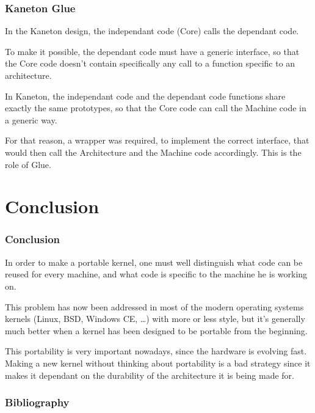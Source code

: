 \begin{frame}
  \frametitle{Kaneton Glue}

  In the Kaneton design, the independant code (Core) calls the dependant code.

  \-

  To make it possible, the dependant code must have a generic interface, so that the Core code doesn't contain specifically any call to a function specific to an architecture.

  \-

  In Kaneton, the independant code and the dependant code functions share exactly the same prototypes, so that the Core code can call the Machine code in a generic way.

  \-

  For that reason, a wrapper was required, to implement the correct interface, that would then call the Architecture and the Machine code accordingly. This is the role of Glue.

\end{frame}

\section{Conclusion}

\begin{frame}
  \frametitle{Conclusion}

  In order to make a portable kernel, one must well distinguish what code can be reused for every machine, and what code is specific to the machine he is working on.

  \-

  This problem has now been addressed in most of the modern operating systems kernels (Linux, BSD, Windows CE, \ldots) with more or less style, but it's generally much better when a kernel has been designed to be portable from the beginning.

  \-

  This portability is very important nowadays, since the hardware is evolving fast. Making a new kernel without thinking about portability is a bad strategy since it makes it dependant on the durability of the architecture it is being made for.

  
\end{frame}


%
%

\begin{frame}[allowframebreaks]
  \frametitle{Bibliography}

  
  
\end{frame}


